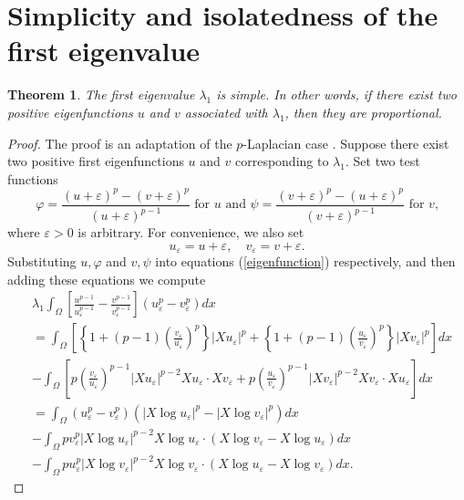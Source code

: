 \documentclass[a4paper,12pt,reqno]{amsart}
\renewcommand\eqref[1]{(\ref{#1})} %
\numberwithin{equation}{section}
\theoremstyle{plain}
\newtheorem{thm}{Theorem}[section]
\theoremstyle{definition}
\begin{document}
\section{Simplicity and isolatedness of the first eigenvalue}\label{sec4}
\begin{thm}\label{simplicity theorem}
The first eigenvalue $\lambda_{1}$ is simple. In other words, if there exist two positive eigenfunctions $u$ and $v$ associated with $\lambda_{1}$, then they are proportional.
\end{thm}
\begin{proof}
The proof is an adaptation of the $p$-Laplacian case \cite{Lin1990}. Suppose there exist two positive first eigenfunctions $u$ and $v$ corresponding to $\lambda_{1}$.
Set two test functions
\begin{equation*}
\varphi=\frac{(u+\varepsilon)^{p}-(v+\varepsilon)^{p}}{(u+\varepsilon)^{p-1}} \text { for $u$ and } \psi=\frac{(v+\varepsilon)^{p}-(u+\varepsilon)^{p}}{(v+\varepsilon)^{p-1}} \text{ for $v$,}
\end{equation*}
where $\varepsilon>0$ is arbitrary. 
For convenience, we also set
\begin{equation*}
u_{\varepsilon}=u+\varepsilon, \quad v_{\varepsilon}=v+\varepsilon  .  
\end{equation*}
Substituting $u,\varphi$ and $v,\psi$ into equations \eqref{eigenfunction} respectively, and then adding these equations we compute
\begin{equation*}
\begin{aligned}
&\lambda_{1} \int_{\Omega}  {\left[\frac{u^{p-1}}{u_{\varepsilon}^{p-1}}-\frac{v^{p-1}}{v_{\varepsilon}^{p-1}}\right]\left(u_{\varepsilon}^{p}-v_{\varepsilon}^{p}\right) d x } \\
&= \int_{\Omega}\left[\left\{1+(p-1)\left(\frac{v_{\varepsilon}}{u_{\varepsilon}}\right)^{p}\right\}\left|X u_{\varepsilon}\right|^{p}+\left\{1+(p-1)\left(\frac{u_{\varepsilon}}{v_{\varepsilon}}\right)^{p}\right\}\left|X v_{\varepsilon}\right|^{p}\right] d x \\
&-\int_{\Omega}\left[p\left(\frac{v_{\varepsilon}}{u_{\varepsilon}}\right)^{p-1}\left|X u_{\varepsilon}\right|^{p-2} X u_{\varepsilon} \cdot X v_{\varepsilon}+p\left(\frac{u_{\varepsilon}}{v_{\varepsilon}}\right)^{p-1}\left|X v_{\varepsilon}\right|^{p-2} X v_{\varepsilon} \cdot X u_{\varepsilon}\right] d x \\
&= \int_{\Omega}\left(u_{\varepsilon}^{p}-v_{\varepsilon}^{p}\right)\left(\left|X \log u_{\varepsilon}\right|^{p}-\left|X \log v_{\varepsilon}\right|^{p}\right) d x \\
&-\int_{\Omega} p v_{\varepsilon}^{p}\left|X \log u_{\varepsilon}\right|^{p-2} X \log u_{\varepsilon} \cdot\left(X \log v_{\varepsilon}-X \log u_{\varepsilon}\right) d x \\
&-\int_{\Omega} p u_{\varepsilon}^{p}\left|X \log v_{\varepsilon}\right|^{p-2} X \log v_{\varepsilon} \cdot\left(X \log u_{\varepsilon}-X \log v_{\varepsilon}\right) d x.
\end{aligned}
\end{equation*}


\end{proof}
\end{document}
